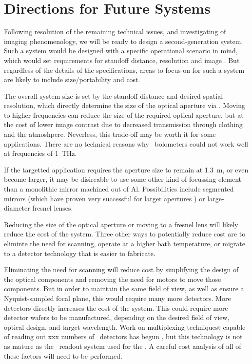 \section{Directions for Future Systems}

Following resolution of the remaining technical issues, and investigating of imaging phenomenology, we will be ready to design a second-generation system.
Such a system would be designed with a specific operational scenario in mind, which would set requirements for standoff distance, resolution and image \NETD.
But regardless of the details of the specifications, areas to focus on for such a system are likely to include size/portability and cost.

The overall system size is set by the standoff distance and desired spatial resolution, which directly determine the size of the optical aperture via .
Moving to higher frequencies can reduce the size of the required optical aperture, but at the cost of lower image contrast due to decreased transmission through clothing and the atmoshpere.
Neverless, this trade-off may be worth it for some applications.
There are no technical reasons why \TES\ bolometers could not work well at frequencies of \SI{1}{\THz}.

If the targetted application requires the aperture size to remain at \SI{1.3}{\m}, or even become larger, it may be disireable to use some other kind of focussing element than a monolithic mirror machined out of Al.
Possibilities include segmented mirrors (which have proven very successful for larger apertures \cite{stp, act}) or large-diameter fresnel lenses.

Reducing the size of the optical aperture or moving to a fresnel lens will likely reduce the cost of the system.
Three other ways to potentially reduce cost are to eliminte the need for scanning, operate at a higher bath temperature, or migrate to a detector technology that is easier to fabricate.

Eliminating the need for scanning will reduce cost by simplifying the design of the optical components and removing the need for motors to move those components.
But in order to maintain the same field of view, as well as ensure a Nyquist-sampled focal plane, this would require many more detectors.
More detectors directly increases the cost of the system.
This could require more detector wafers to be manufactured, depending on the desired field of view, optical design, and target wavelength.
Work on multiplexing techniquest capable of reading out xxx numbers of \TES\ detectors has begun \cite{xxx}, but this technology is not as mature as the \TDM\ readout system used for the \Imager.
A careful cost analysis of all of these factors will need to be performed.

